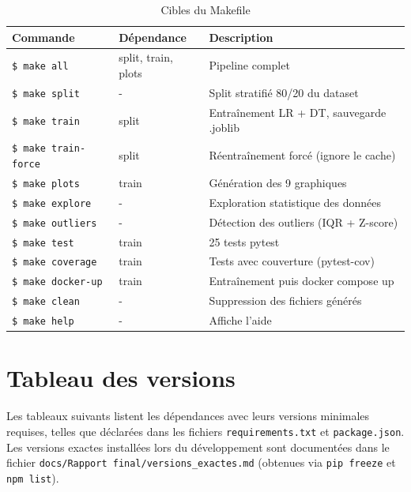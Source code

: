 \documentclass[12pt,a4paper,openany]{report}
\newcommand{\file}[1]{\texttt{#1}}
\newcommand{\cmd}[1]{\texttt{\$ #1}}
\begin{document}
\begin{table}[H]
    \centering
    \caption{Cibles du Makefile}
    \label{tab:makefile}
    \begin{tabularx}{\textwidth}{l l X}
        \toprule
        \textbf{Commande} & \textbf{Dépendance} & \textbf{Description} \\
        \midrule
        \cmd{make all}         & split, train, plots  & Pipeline complet \\
        \cmd{make split}       & -                  & Split stratifié 80/20 du dataset \\
        \cmd{make train}       & split                & Entraînement LR + DT, sauvegarde .joblib \\
        \cmd{make train-force} & split                & Réentraînement forcé (ignore le cache) \\
        \cmd{make plots}       & train                & Génération des 9 graphiques \\
        \cmd{make explore}     & -                  & Exploration statistique des données \\
        \cmd{make outliers}    & -                  & Détection des outliers (IQR + Z-score) \\
        \cmd{make test}        & train                & 25 tests pytest \\
        \cmd{make coverage}    & train                & Tests avec couverture (pytest-cov) \\
        \cmd{make docker-up}   & train                & Entraînement puis docker compose up \\
        \cmd{make clean}       & -                  & Suppression des fichiers générés \\
        \cmd{make help}        & -                  & Affiche l'aide \\
        \bottomrule
    \end{tabularx}
\end{table}

\section{Tableau des versions}

Les tableaux suivants listent les dépendances avec leurs versions minimales requises, telles que déclarées dans les fichiers \file{requirements.txt} et \file{package.json}. Les versions exactes installées lors du développement sont documentées dans le fichier \file{docs/Rapport final/versions\_exactes.md} (obtenues via \texttt{pip freeze} et \texttt{npm list}).
\end{document}
